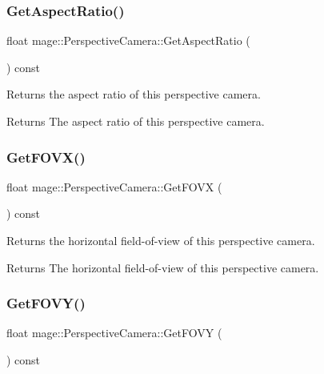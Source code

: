 \subsubsection{\texorpdfstring{Get\+Aspect\+Ratio()}{GetAspectRatio()}}
{\footnotesize\ttfamily float mage\+::\+Perspective\+Camera\+::\+Get\+Aspect\+Ratio (\begin{DoxyParamCaption}{ }\end{DoxyParamCaption}) const\hspace{0.3cm}{\ttfamily [noexcept]}}

Returns the aspect ratio of this perspective camera.

\begin{DoxyReturn}{Returns}
The aspect ratio of this perspective camera. 
\end{DoxyReturn}
\hypertarget{classmage_1_1_perspective_camera_a7be6cca6d80066aa800fb1ad9c45d56d}{}\label{classmage_1_1_perspective_camera_a7be6cca6d80066aa800fb1ad9c45d56d} 
\subsubsection{\texorpdfstring{Get\+F\+O\+V\+X()}{GetFOVX()}}
{\footnotesize\ttfamily float mage\+::\+Perspective\+Camera\+::\+Get\+F\+O\+VX (\begin{DoxyParamCaption}{ }\end{DoxyParamCaption}) const\hspace{0.3cm}{\ttfamily [noexcept]}}

Returns the horizontal field-\/of-\/view of this perspective camera.

\begin{DoxyReturn}{Returns}
The horizontal field-\/of-\/view of this perspective camera. 
\end{DoxyReturn}
\hypertarget{classmage_1_1_perspective_camera_a31fbcab811e480c8f58dbcd9b844e91b}{}\label{classmage_1_1_perspective_camera_a31fbcab811e480c8f58dbcd9b844e91b} 
\subsubsection{\texorpdfstring{Get\+F\+O\+V\+Y()}{GetFOVY()}}
{\footnotesize\ttfamily float mage\+::\+Perspective\+Camera\+::\+Get\+F\+O\+VY (\begin{DoxyParamCaption}{ }\end{DoxyParamCaption}) const\hspace{0.3cm}{\ttfamily [noexcept]}}


